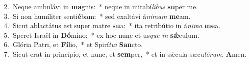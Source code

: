 {2.~}Neque ambulávi in \textbf{ma}gnis:~* neque in mirabí\textit{li}\textit{bus} \textbf{su}per me.\\
{3.~}Si non humíliter senti\textbf{é}bam:~* sed exaltávi á\textit{ni}\textit{mam} \textbf{me}am.\\
{4.~}Sicut ablactátus est super matre \textbf{su}a:~* ita retribútio in á\textit{ni}\textit{ma} \textbf{me}a.\\
{5.~}Speret Israël in \textbf{Dó}mino:~* ex hoc nunc et us\textit{que} \textit{in} \textbf{sǽ}culum.\\
{6.~}Glória Patri, et \textbf{Fí}lio,~* et Spirí\textit{tu}\textit{i} \textbf{San}cto.\\
{7.~}Sicut erat in princípio, et nunc, et \textbf{sem}per,~* et in sǽcula sæcu\textit{ló}\textit{rum}. \textbf{A}men.\\
